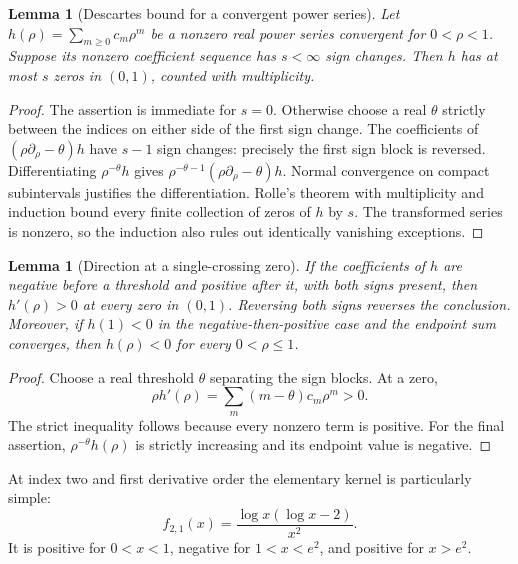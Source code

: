\documentclass[11pt,letterpaper]{article}
\numberwithin{equation}{section}
\newtheorem{lemma}[theorem]{Lemma}
\theoremstyle{definition}\newtheorem{definition}[theorem]{Definition}
\theoremstyle{remark}\newtheorem{remark}[theorem]{Remark}
\begin{document}
\begin{lemma}[Descartes bound for a convergent power series]\label{lem:descartes}
Let $h(\rho)=\sum_{m\ge0}c_m\rho^m$ be a nonzero real power series convergent for $0<\rho<1$. Suppose its nonzero coefficient sequence has $s<\infty$ sign changes. Then $h$ has at most $s$ zeros in $(0,1)$, counted with multiplicity.
\end{lemma}
\begin{proof}
The assertion is immediate for $s=0$. Otherwise choose a real $\theta$ strictly between the indices on either side of the first sign change. The coefficients of
$(\rho\partial_\rho-\theta)h$ have $s-1$ sign changes: precisely the first sign block is reversed. Differentiating $\rho^{-\theta}h$ gives $\rho^{-\theta-1}(\rho\partial_\rho-\theta)h$. Normal convergence on compact subintervals justifies the differentiation. Rolle's theorem with multiplicity and induction bound every finite collection of zeros of $h$ by $s$. The transformed series is nonzero, so the induction also rules out identically vanishing exceptions.
\end{proof}

\begin{lemma}[Direction at a single-crossing zero]\label{lem:crossing}
If the coefficients of $h$ are negative before a threshold and positive after it, with both signs present, then $h'(\rho)>0$ at every zero in $(0,1)$. Reversing both signs reverses the conclusion. Moreover, if $h(1)<0$ in the negative-then-positive case and the endpoint sum converges, then $h(\rho)<0$ for every $0<\rho\le1$.
\end{lemma}
\begin{proof}
Choose a real threshold $\theta$ separating the sign blocks. At a zero,
\[
 \rho h'(\rho)=\sum_m(m-\theta)c_m\rho^m>0.
\]
The strict inequality follows because every nonzero term is positive. For the final assertion, $\rho^{-\theta}h(\rho)$ is strictly increasing and its endpoint value is negative.
\end{proof}

At index two and first derivative order the elementary kernel is particularly simple:
\begin{equation}\label{eq:f21}
 f_{2,1}(x)=\frac{\log x(\log x-2)}{x^2}.
\end{equation}
It is positive for $0<x<1$, negative for $1<x<e^2$, and positive for $x>e^2$.
\end{document}
